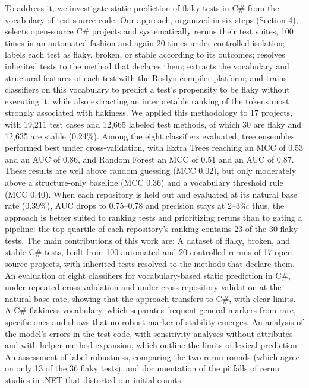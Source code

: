 To address it, we investigate static prediction of flaky tests in C\# from the vocabulary of test source code. Our approach, organized in six steps (Section 4), selects open-source C\# projects and systematically reruns their test suites, 100 times in an automated fashion and again 20 times under controlled isolation; labels each test as flaky, broken, or stable according to its outcomes; resolves inherited tests to the method that declares them; extracts the vocabulary and structural features of each test with the Roslyn compiler platform; and trains classifiers on this vocabulary to predict a test's propensity to be flaky without executing it, while also extracting an interpretable ranking of the tokens most strongly associated with flakiness.
We applied this methodology to 17 projects, with 19,211 test cases and 12,665 labeled test methods, of which 30 are flaky and 12,635 are stable (0.24\%). Among the eight classifiers evaluated, tree ensembles performed best under cross-validation, with Extra Trees reaching an MCC of 0.53 and an AUC of 0.86, and Random Forest an MCC of 0.51 and an AUC of 0.87. These results are well above random guessing (MCC 0.02), but only moderately above a structure-only baseline (MCC 0.36) and a vocabulary threshold rule (MCC 0.40). When each repository is held out and evaluated at its natural base rate (0.39\%), AUC drops to 0.75--0.78 and precision stays at 2--3\%; thus, the approach is better suited to ranking tests and prioritizing reruns than to gating a pipeline: the top quartile of each repository's ranking contains 23 of the 30 flaky tests.
The main contributions of this work are:
A dataset of flaky, broken, and stable C\# tests, built from 100 automated and 20 controlled reruns of 17 open-source projects, with inherited tests resolved to the methods that declare them.
An evaluation of eight classifiers for vocabulary-based static prediction in C\#, under repeated cross-validation and under cross-repository validation at the natural base rate, showing that the approach transfers to C\#, with clear limits.
A C\# flakiness vocabulary, which separates frequent general markers from rare, specific ones and shows that no robust marker of stability emerges.
An analysis of the model's errors in the test code, with sensitivity analyses without attributes and with helper-method expansion, which outline the limits of lexical prediction.
An assessment of label robustness, comparing the two rerun rounds (which agree on only 13 of the 36 flaky tests), and documentation of the pitfalls of rerun studies in .NET that distorted our initial counts.